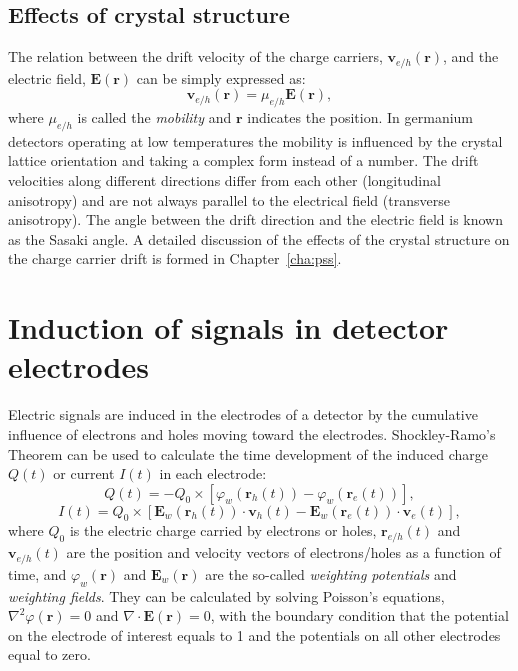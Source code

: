 \subsection{Effects of crystal structure}
\label{sec:det:struc}
The relation between the drift velocity of the charge carriers,
$\mathbf{v}_{e/h}(\mathbf{r})$, and the electric field,
$\mathbf{E}(\mathbf{r})$ can be simply expressed as:
\begin{equation} 
\label{eq:det:dv}
\mathbf{v}_{e/h} (\mathbf{r})= \mu_{e/h} \mathbf{E}(\mathbf{r}),
\end{equation}
where $\mu_{e/h}$ is called the \emph{mobility} and $\mathbf{r}$
indicates the position. In germanium detectors operating at low
temperatures the mobility is influenced by the crystal lattice
orientation and taking a complex form instead of a number. The drift
velocities along different directions differ from each other
(longitudinal anisotropy) and are not always parallel to the
electrical field (transverse anisotropy). The angle between the drift
direction and the electric field is known as the Sasaki
angle\cite{Sas56}. A detailed discussion of the effects of the crystal
structure on the charge carrier drift is formed in
Chapter~\ref{cha:pss}.

\section{Induction of signals in detector electrodes}
\label{sec:det:ramo}
Electric signals are induced in the electrodes of a detector by the
cumulative influence of electrons and holes moving toward the
electrodes. Shockley-Ramo's Theorem \cite{Gat82, Rad88, He00} can be
used to calculate the time development of the induced charge $Q(t)$ or
current $I(t)$ in each electrode:
\begin{equation} 
\label{eq:det:ramoq}
Q(t) = -Q_{0} \times [\varphi_{w}(\mathbf{r}_{h}(t)) -
\varphi_{w}(\mathbf{r}_{e}(t))],
\end{equation}
\begin{equation} 
\label{eq:det:ramoi}
I(t) = Q_{0} \times [\mathbf{E}_{w}(\mathbf{r}_{h}(t)) \cdot 
\mathbf{v}_{h}(t) - \mathbf{E}_{w}(\mathbf{r}_{e}(t)) \cdot 
\mathbf{v}_{e}(t)],
\end{equation}
where $Q_{0}$ is the electric charge carried by electrons or holes,
$\mathbf{r}_{e/h}(t)$ and $\mathbf{v}_{e/h}(t)$ are the position and
velocity vectors of electrons/holes as a function of time, and
$\varphi_{w}(\mathbf{r})$ and $\mathbf{E}_{w}(\mathbf{r})$ are the
so-called \emph{weighting potentials} and \emph{weighting
fields}. They can be calculated by solving Poisson's equations,
$\nabla^{2} \varphi(\mathbf{r}) = 0$ and $\nabla \cdot
\mathbf{E}(\mathbf{r}) = 0$, with the boundary condition that the
potential on the electrode of interest equals to 1 and the potentials
on all other electrodes equal to zero.

